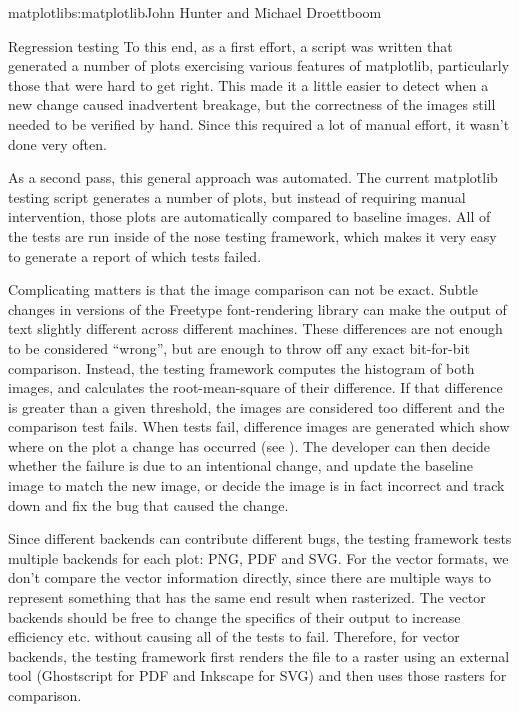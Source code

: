 \begin{aosachapter}{matplotlib}{s:matplotlib}{John Hunter and Michael Droettboom}
\begin{aosasect1}{Regression testing}
To this end, as a first effort, a script was written that generated a
number of plots exercising various features of matplotlib,
particularly those that were hard to get right.  This made it a little
easier to detect when a new change caused inadvertent breakage, but
the correctness of the images still needed to be verified by hand.
Since this required a lot of manual effort, it wasn't done very often.

As a second pass, this general approach was automated.  The current
matplotlib testing script generates a number of plots, but instead of
requiring manual intervention, those plots are automatically compared
to baseline images.  All of the tests are run inside of the nose
testing framework, which makes it very easy to generate a report of
which tests failed.

Complicating matters is that the image comparison can not be exact.
Subtle changes in versions of the Freetype font-rendering library can
make the output of text slightly different across different machines.
These differences are not enough to be considered ``wrong'', but are
enough to throw off any exact bit-for-bit comparison.  Instead, the
testing framework computes the histogram of both images, and
calculates the root-mean-square of their difference.  If that
difference is greater than a given threshold, the images are
considered too different and the comparison test fails.  When tests
fail, difference images are generated which show where on the plot a
change has occurred (see ).  The
developer can then decide whether the failure is due to an intentional
change, and update the baseline image to match the new image, or
decide the image is in fact incorrect and track down and fix the bug
that caused the change.


Since different backends can contribute different bugs, the testing
framework tests multiple backends for each plot: PNG, PDF and SVG.
For the vector formats, we don't compare the vector information
directly, since there are multiple ways to represent something that
has the same end result when rasterized.  The vector backends should
be free to change the specifics of their output to increase efficiency
etc. without causing all of the tests to fail.  Therefore, for vector
backends, the testing framework first renders the file to a raster
using an external tool (Ghostscript for PDF and Inkscape for SVG) and
then uses those rasters for comparison.


\end{aosasect1}
\end{aosachapter}
